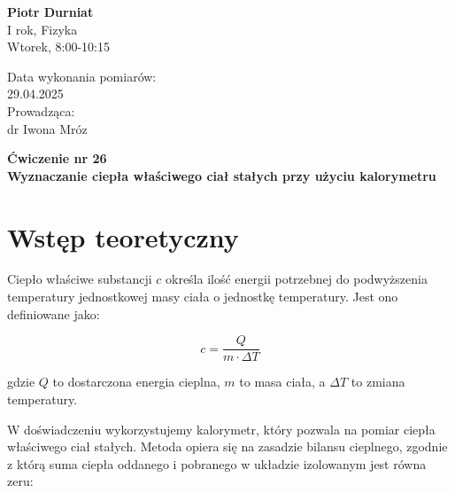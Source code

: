 \documentclass[a4paper,12pt]{article}
\begin{document}
\noindent
\begin{minipage}{0.5\textwidth}
    \raggedright
    \textbf{Piotr Durniat} \\
    I rok, Fizyka \\
    Wtorek, 8:00-10:15 \\
    \vspace{0.5cm}
    \vspace{0.5cm}
\end{minipage}%
\begin{minipage}{0.5\textwidth}
    \raggedleft
    Data wykonania pomiarów: \\
    29.04.2025 \\
    \vspace{0.5cm} %
    Prowadząca: \\
    dr Iwona Mróz
\end{minipage}

\vspace{2cm} %
\begin{center}
    \LARGE \textbf{Ćwiczenie nr 26} \\[0.5cm]
    \Large \textbf{Wyznaczanie ciepła właściwego ciał stałych przy użyciu kalorymetru}
\end{center}

\vspace{1cm} %
\noindent

\tableofcontents
\newpage

\section{Wstęp teoretyczny}

Ciepło właściwe substancji $c$ określa ilość energii potrzebnej do podwyższenia temperatury jednostkowej masy ciała o jednostkę temperatury. Jest ono definiowane jako:

\begin{equation}
    c = \frac{Q}{m \cdot \Delta T}
\end{equation}

gdzie $Q$ to dostarczona energia cieplna, $m$ to masa ciała, a $\Delta T$ to zmiana temperatury.

W doświadczeniu wykorzystujemy kalorymetr, który pozwala na pomiar ciepła właściwego ciał stałych. Metoda opiera się na zasadzie bilansu cieplnego, zgodnie z którą suma ciepła oddanego i pobranego w układzie izolowanym jest równa zeru:
\end{document}
